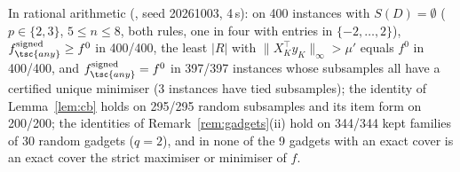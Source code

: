 \begin{remark}\label{rem:verify-signed}
{\sloppy In rational arithmetic (, seed 20261003, 4\,s): on 400 instances with $S(D)=\emptyset$ ($p\in\{2,3\}$, $5\le n\le8$, both rules, one in four with entries in $\{-2,\dots,2\}$), $f^{\mathrm{signed}}_{\tsc{any}}\ge f^0$ in 400/400, the least $|R|$ with $\lVert X_K^{\top}y_K\rVert_\infty>\mu'$ equals $f^0$ in 400/400, and $f^{\mathrm{signed}}_{\tsc{any}}=f^0$ in 397/397 instances whose subsamples all have a certified unique minimiser (3 instances have tied subsamples); the identity of Lemma~\ref{lem:cb} holds on 295/295 random subsamples and its item form on 200/200; the identities of Remark~\ref{rem:gadgets}(ii) hold on 344/344 kept families of 30 random gadgets ($q=2$), and in none of the 9 gadgets with an exact cover is an exact cover the strict maximiser or minimiser of $f$.\par}
\end{remark}
